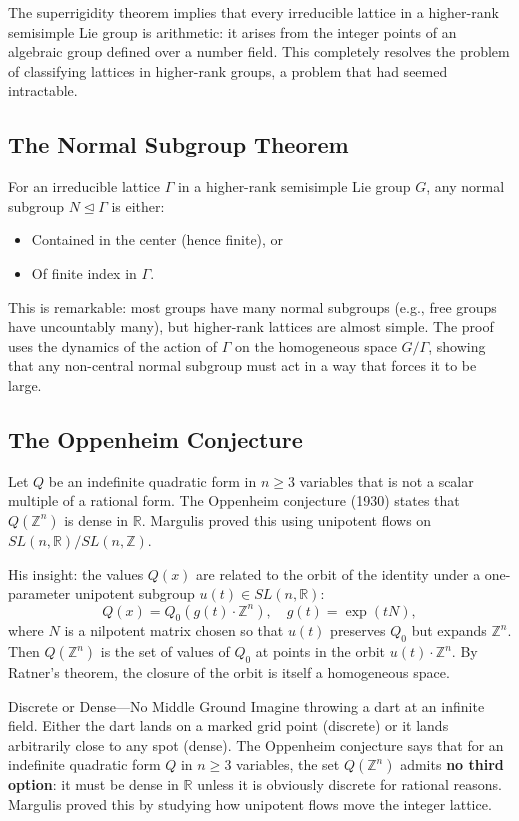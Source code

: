 The superrigidity theorem implies that every irreducible lattice in a higher-rank semisimple Lie group is arithmetic: it arises from the integer points of an algebraic group defined over a number field. This completely resolves the problem of classifying lattices in higher-rank groups, a problem that had seemed intractable.

\subsection{The Normal Subgroup Theorem}

For an irreducible lattice $\Gamma$ in a higher-rank semisimple Lie group $G$, any normal subgroup $N \trianglelefteq \Gamma$ is either:
\begin{itemize}
\item Contained in the center (hence finite), or
\item Of finite index in $\Gamma$.
\end{itemize}

This is remarkable: most groups have many normal subgroups (e.g., free groups have uncountably many), but higher-rank lattices are almost simple. The proof uses the dynamics of the action of $\Gamma$ on the homogeneous space $G/\Gamma$, showing that any non-central normal subgroup must act in a way that forces it to be large.

\subsection{The Oppenheim Conjecture}

Let $Q$ be an indefinite quadratic form in $n \geq 3$ variables that is not a scalar multiple of a rational form. The Oppenheim conjecture (1930) states that $Q(\mathbb{Z}^n)$ is dense in $\mathbb{R}$. Margulis proved this using unipotent flows on $SL(n,\mathbb{R})/SL(n,\mathbb{Z})$.

His insight: the values $Q(x)$ are related to the orbit of the identity under a one-parameter unipotent subgroup $u(t) \in SL(n,\mathbb{R})$:
\[
Q(x) = Q_0(g(t) \cdot \mathbb{Z}^n), \quad g(t) = \exp(tN),
\]
where $N$ is a nilpotent matrix chosen so that $u(t)$ preserves $Q_0$ but expands $\mathbb{Z}^n$. Then $Q(\mathbb{Z}^n)$ is the set of values of $Q_0$ at points in the orbit $u(t) \cdot \mathbb{Z}^n$. By Ratner's theorem, the closure of the orbit is itself a homogeneous space.

\begin{analogy}{Discrete or Dense---No Middle Ground}
Imagine throwing a dart at an infinite field. Either the dart lands on a marked grid point (discrete) or it lands arbitrarily close to any spot (dense). The Oppenheim conjecture says that for an indefinite quadratic form $Q$ in $n \geq 3$ variables, the set $Q(\mathbb{Z}^n)$ admits \textbf{no third option}: it must be dense in $\mathbb{R}$ unless it is obviously discrete for rational reasons. Margulis proved this by studying how unipotent flows move the integer lattice.
\end{analogy}

